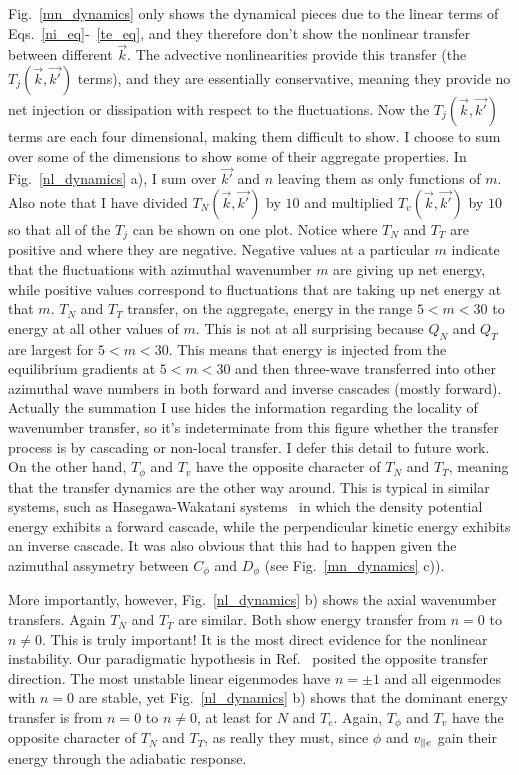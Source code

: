 Fig.~\ref{mn_dynamics} only shows the dynamical pieces due to the linear terms of Eqs.~\ref{ni_eq}-~\ref{te_eq}, and they therefore don't show the nonlinear transfer between different $\vec{k}$.
The advective nonlinearities provide this transfer (the $T_j(\vec{k},\vec{k'})$ terms), 
and they are essentially conservative, meaning they provide no net injection or dissipation with respect to the fluctuations. Now the $T_j(\vec{k},\vec{k'})$ terms are each four dimensional,
making them difficult to show. I choose to sum over some of the dimensions to show some of their aggregate properties. In Fig.~\ref{nl_dynamics} a), I sum over $\vec{k'}$ and $n$ leaving them
as only functions of $m$. Also note that I have divided $T_N(\vec{k},\vec{k'})$ by $10$ and multiplied $T_v(\vec{k},\vec{k'})$ by $10$ so that all of the $T_j$ can be shown on one plot.
Notice where $T_N$ and $T_T$ are positive and where they are negative. Negative values at a particular $m$ indicate that the fluctuations with azimuthal wavenumber $m$ are giving up net energy, 
while positive values correspond to fluctuations that are taking up net energy at that $m$. 
$T_N$ and $T_T$ transfer, on the aggregate, energy in the range $5 < m < 30$ to energy at all other values of $m$. This is not at all surprising because $Q_N$ and $Q_T$ are largest
for $5 < m < 30$. This means that energy is injected from the equilibrium gradients at $5 < m < 30$ and then three-wave transferred into other azimuthal wave numbers in both forward and inverse
cascades (mostly forward). 
Actually the summation I use hides the information regarding the locality of wavenumber transfer, so it's indeterminate from this figure whether the transfer process is by cascading or non-local transfer.
I defer this detail to future work. 
On the other hand, $T_\phi$ and $T_v$ have the opposite character of $T_N$ and $T_T$, meaning that the transfer dynamics are the other way around. This is typical in 
similar systems, such as Hasegawa-Wakatani systems~\cite{hasegawa1983,Camargo1995} in which the density potential energy exhibits a forward cascade, while the perpendicular kinetic energy
exhibits an inverse cascade. It was also obvious that this had to happen given the azimuthal assymetry between $C_\phi$ and $D_\phi$ (see Fig.~\ref{mn_dynamics} c)).

More importantly, however, Fig.~\ref{nl_dynamics} b) shows the axial wavenumber transfers. Again $T_N$ and $T_T$ are similar. Both show energy transfer from $n=0$ to $n \ne 0$. This is truly important!
It is the most direct evidence for the nonlinear instability.
Our paradigmatic hypothesis in Ref.~\cite{Umansky2011} posited the opposite transfer direction. The most unstable linear eigenmodes have $n = \pm 1$ and all eigenmodes with $n=0$ are stable,
yet Fig.~\ref{nl_dynamics} b) shows that the dominant energy transfer is from $n=0$ to $n \ne 0$, at least for $N$ and $T_e$. Again, $T_\phi$ and $T_v$ have the opposite character of $T_N$ and $T_T$,
as really they must, since $\phi$ and $v_{\parallel e}$ gain their energy through the adiabatic response.

